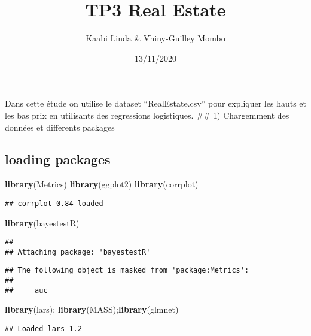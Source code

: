 \documentclass[
]{article}
\title{TP3 Real Estate}
\author{Kaabi Linda \& Vhiny-Guilley Mombo}
\date{13/11/2020}
\newenvironment{Shaded}{\begin{snugshade}}{\end{snugshade}}
\newcommand{\KeywordTok}[1]{\textcolor[rgb]{0.13,0.29,0.53}{\textbf{#1}}}
\newcommand{\NormalTok}[1]{#1}
\begin{document}
\maketitle

Dans cette étude on utilise le dataset ``RealEstate.csv'' pour expliquer
les hauts et les bas prix en utilisants des regressions logistiques.
\#\# 1) Chargemment des données et differents packages

\hypertarget{loading-packages}{%
\subsection{loading packages}\label{loading-packages}}

\begin{Shaded}
\begin{Highlighting}[]
\KeywordTok{library}\NormalTok{(Metrics)}
\KeywordTok{library}\NormalTok{(ggplot2)}
\KeywordTok{library}\NormalTok{(corrplot)}
\end{Highlighting}
\end{Shaded}

\begin{verbatim}
## corrplot 0.84 loaded
\end{verbatim}

\begin{Shaded}
\begin{Highlighting}[]
\KeywordTok{library}\NormalTok{(bayestestR)}
\end{Highlighting}
\end{Shaded}

\begin{verbatim}
## 
## Attaching package: 'bayestestR'
\end{verbatim}

\begin{verbatim}
## The following object is masked from 'package:Metrics':
## 
##     auc
\end{verbatim}

\begin{Shaded}
\begin{Highlighting}[]
\KeywordTok{library}\NormalTok{(lars); }\KeywordTok{library}\NormalTok{(MASS);}\KeywordTok{library}\NormalTok{(glmnet)}
\end{Highlighting}
\end{Shaded}

\begin{verbatim}
## Loaded lars 1.2
\end{verbatim}
\end{document}
